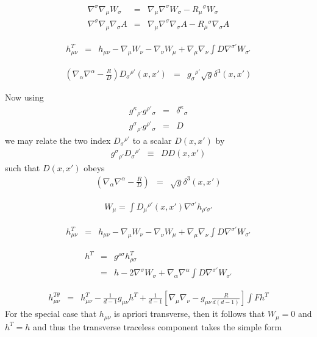 \documentclass[10pt,letterpaper]{article}
\numberwithin{equation}{section}
\begin{document}
\begin{eqnarray}
\nabla^\sigma \nabla_\mu W_{\sigma} &=& \nabla_\mu \nabla^\sigma W_\sigma - R_\mu{}^\sigma W_\sigma
\nonumber\\
\nabla^\sigma \nabla_\mu \nabla_\sigma A &=& \nabla_\mu \nabla^\sigma\nabla_\sigma A - R_\mu{}^\sigma \nabla_\sigma A
\end{eqnarray}

\begin{eqnarray}
h_{\mu\nu}^{T}&=& h_{\mu\nu}-\nabla_\mu W_\nu - \nabla_\nu W_\mu + \nabla_\mu\nabla_\nu \int D \nabla^{\sigma'}W_{\sigma'}
\end{eqnarray}

\begin{eqnarray}
(\nabla_\alpha\nabla^\alpha - \frac{R}{D})D_\sigma{}^{\rho'}(x,x') &=& g_{\sigma}{}^{\rho'} \sqrt{g} \delta^3(x,x')
\end{eqnarray}

Now using
\begin{eqnarray}
g^{\kappa}{}_{\rho'} g^{\rho'}{}_\sigma &=& \delta^\kappa{}_\sigma
\nonumber\\
g^{\sigma}{}_{\rho'} g^{\rho'}{}_\sigma &=& D
\end{eqnarray}
%
we may relate the two index $D_{\sigma}{}^{\rho'}$ to a scalar $D(x,x')$ by
\begin{eqnarray}
g^{\sigma}{}_{\rho'} D_{\sigma}{}^{\rho'} &\equiv& D D(x,x')
\end{eqnarray}
%
such that $D(x,x')$ obeys
\begin{eqnarray}
(\nabla_\alpha\nabla^\alpha - \frac{R}{D}) &=& \sqrt g \delta^3(x,x')
\end{eqnarray}

\begin{eqnarray}
W_\mu = \int D_\mu{}^{\rho'}(x,x')\nabla^{\sigma'}h_{\rho'\sigma'}
\end{eqnarray}

\begin{eqnarray}
h^T_{\mu\nu} &=& h_{\mu\nu}-\nabla_\mu W_\nu -\nabla_\nu W_\mu + \nabla_\mu\nabla_\nu \int D \nabla^{\sigma'}W_{\sigma'}
\end{eqnarray}

\begin{eqnarray}
h^T &=& g^{\rho\sigma}h^T_{\rho\sigma}
\nonumber\\
&=& h-2\nabla^\sigma W_\sigma + \nabla_\alpha \nabla^\alpha \int D \nabla^{\sigma'}W_{\sigma'}
\end{eqnarray}

\begin{eqnarray}
h_{\mu\nu}^{T\theta} &=& h^T_{\mu\nu} - \frac{1}{d-1} g_{\mu\nu}h^T + \frac{1}{d-1}\left[\nabla_\mu\nabla_\nu - g_{\mu\nu}\frac{R}{d(d-1)}\right] \int F h^T 
\end{eqnarray}
%
For the special case that $h_{\mu\nu}$ is apriori transverse, then it follows that $W_\mu =0$ and $h^T = h$ and thus the transverse traceless component takes the simple form
\end{document}
